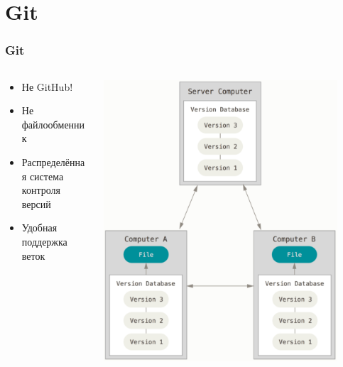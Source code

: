 \documentclass[xetex,mathserif,serif]{beamer}
\begin{document}
	\section{Git}

	\begin{frame}
		\frametitle{Git}
		\begin{columns}
			\begin{column}{0.5\textwidth}
				\begin{itemize}
					\item Не GitHub!
					\item Не файлообменник
					\item Распределённая система контроля версий
					\item Удобная поддержка веток
				\end{itemize}
			\end{column}
			\begin{column}{0.5\textwidth}
				\includegraphics[width=0.9\textwidth]{distributedVcs.png}
			\end{column}
		\end{columns}
	\end{frame}
\end{document}
